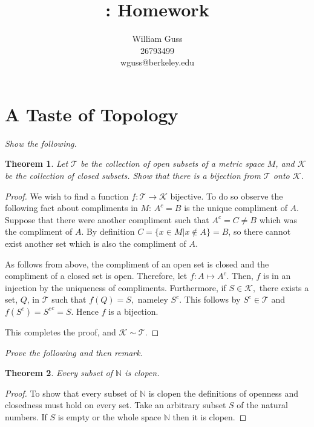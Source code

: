 \documentclass[letter]{article}
\title{\bCLASS: Homework \bHWN}
\author{William Guss\\26793499\\wguss@berkeley.edu}
\newtheorem{theorem}{Theorem}
\newenvironment{menumerate}{%
  \edef\backupindent{\the\parindent}%
  \enumerate%
  \setlength{\parindent}{\backupindent}%
}{\endenumerate}
\begin{document}
\maketitle
\thispagestyle{empty}


\setcounter{section}{1}
\section{A Taste of Topology}

	\begin{menumerate}
		\setcounter{enumi}{28}
		\item \emph{Show the following.}
			\begin{theorem}
				Let $\mathcal{T}$ be the collection of open subsets of a metric space $M$, and $\mathcal{K}$ be the collection of closed subsets. Show that there is a bijection from $\mathcal{T}$ onto $\mathcal{K}$.
			\end{theorem}
			\begin{proof}
				We wish to find a function $f: \mathcal{T} \to \mathcal{K}$ bijective. To do so observe the following fact about compliments in $M$: $A^c = B$ is the unique compliment of $A.$ Suppose that there were another compliment such that $A^c = C \neq B$ which was the compliment of $A$. By definition $C = \{x \in M | x \notin A\} = B$, so there cannot exist another set which is also the compliment of $A.$

				As follows from above, the compliment of an open set is closed and the compliment of a closed set is open. Therefore, let $f: A \mapsto A^c.$ Then, $f$ is in an injection by the uniqueness of compliments. Furthermore, if $S \in \mathcal{K},$ there exists a set, $Q$, in $\mathcal{T}$ such that $f(Q) = S,$ nameley $S^c.$ This follows by $S^c \in \mathcal{T}$ and $f(S^c) = {S^c}^c = S$. Hence $f$ is a bijection.

				This completes the proof, and $\mathcal{K} \sim \mathcal{T}.$
			\end{proof}



		\setcounter{enumi}{31}
		\item \emph{Prove the following and then remark.}
			\begin{theorem}
				Every subset of $\mathbb{N}$ is clopen.
			\end{theorem}
			\begin{proof}
				To show that every subset of $\mathbb{N}$ is clopen the definitions of openness and closedness must hold on every set. Take an arbitrary subset $S$ of the natural numbers. If $S$ is empty or the whole space $\mathbb{N}$ then it is clopen.


\end{proof}
\end{menumerate}
\end{document}
